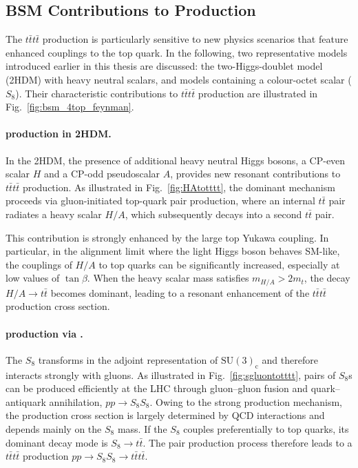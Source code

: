 \subsection{BSM Contributions to \tttthead{} Production}

The $t\bar{t}t\bar{t}$ production is particularly sensitive to new physics scenarios that feature enhanced couplings to the top quark. 
In the following, two representative models introduced earlier in this thesis are discussed: the two-Higgs-doublet model (2HDM) with heavy neutral scalars, and models containing a colour-octet scalar ($S_{8}$).
Their characteristic contributions to $t\bar{t}t\bar{t}$ production are illustrated in Fig.~\ref{fig:bsm_4top_feynman}.

\paragraph{\tttthead{} production in 2HDM.}
In the 2HDM, the presence of additional heavy neutral Higgs bosons, a CP-even scalar \(H\) and a CP-odd pseudoscalar \(A\), provides new resonant contributions to $t\bar{t}t\bar{t}$ production. 
As illustrated in Fig.~\ref{fig:HAtotttt}, the dominant mechanism proceeds via gluon-initiated top-quark pair production,
where an internal \(t\bar{t}\) pair radiates a heavy scalar \(H/A\), which subsequently decays into a second \(t\bar{t}\) pair.

This contribution is strongly enhanced by the large top Yukawa coupling. In particular, in the alignment limit where the light Higgs boson behaves SM-like, 
the couplings of \(H/A\) to top quarks can be significantly increased, especially at low values of \(\tan\beta\).
When the heavy scalar mass satisfies \(m_{H/A} > 2m_t\), the decay \(H/A \to t\bar{t}\) becomes dominant, leading to a resonant enhancement of the $t\bar{t}t\bar{t}$ production cross section.

\paragraph{\tttthead{} production via \sEighthead{}.}
\label{sec:sgluon_tttt}

The $S_{8}$ transforms in the adjoint representation
of \(\mathrm{SU}(3)_\mathrm{c}\) and therefore interacts strongly with gluons.
As illustrated in Fig.~\ref{fig:sgluontotttt}, pairs of $S_{8}$s can be produced efficiently at the LHC through
gluon--gluon fusion and quark--antiquark annihilation,
\(pp \rightarrow S_8 S_8\).
Owing to the strong production mechanism, the production cross section
is largely determined by QCD interactions and depends mainly on the
$S_{8}$ mass.
If the $S_{8}$ couples preferentially to top quarks,
its dominant decay mode is \(S_8 \rightarrow t\bar{t}\).
The pair production process therefore leads to a $t\bar{t}t\bar{t}$ production
\(pp \rightarrow S_8 S_8 \rightarrow t\bar{t}t\bar{t}\).

